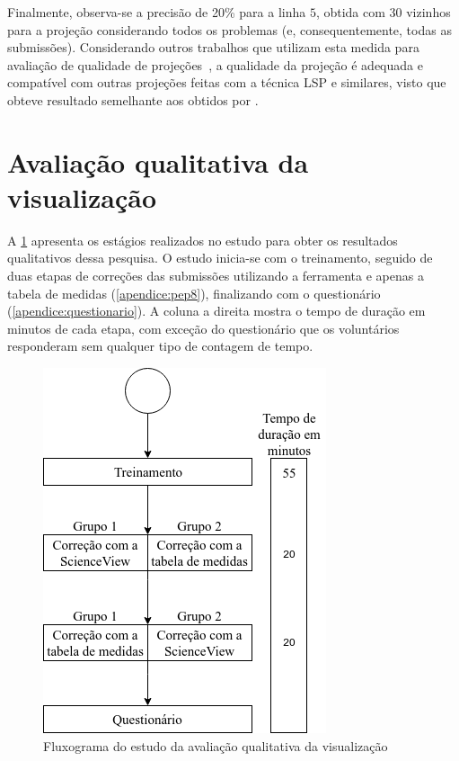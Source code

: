 		Finalmente, observa-se a precisão de 20\% para a linha $5$, obtida com 30 vizinhos
		para a projeção considerando todos os problemas (e, consequentemente, todas as
		submissões). Considerando outros trabalhos que utilizam esta medida para avaliação
		de qualidade de projeções~\cite{phd:paulovich}, a qualidade da projeção é adequada
		e compatível com outras projeções feitas com a técnica LSP e similares, visto
		que obteve resultado semelhante aos obtidos por .
	
	\section{Avaliação qualitativa da visualização}
	\label{sec:avalQualitativa}
	
		A \cref{fig:fluxogramaEstudo} apresenta os estágios realizados no estudo para
		obter os resultados qualitativos dessa pesquisa. O estudo inicia-se com o
		treinamento, seguido de duas etapas de correções das submissões utilizando a
		ferramenta  e apenas a tabela de medidas (\cref{apendice:pep8}),
		finalizando com o questionário (\cref{apendice:questionario}). A coluna a direita
		mostra o tempo de duração em minutos de cada etapa, com exceção do questionário
		que os voluntários responderam sem qualquer tipo de contagem de tempo.
		
		\begin{figure}
			\centering
			\includegraphics[width=0.4\linewidth]{imagem/fluxogramaEstudo}
			\caption{Fluxograma do estudo da avaliação qualitativa da visualização}
			\label{fig:fluxogramaEstudo}
		\end{figure}
		
